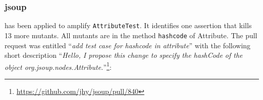 % 


\subsubsection{jsoup}

\dspot has been applied to amplify \texttt{AttributeTest}. 
It identifies one assertion that kills 13 more mutants.
All mutants are in the method \texttt{hashcode} of Attribute. 
The pull request was entitled ``\emph{add test case for hashcode in attribute}'' with the following short description ``\emph{Hello, I propose this change to specify the hashCode of the object org.jsoup.nodes.Attribute.}''\footnote{\url{https://github.com/jhy/jsoup/pull/840}}:
\begin{figure}[H]
	\centering{}
\end{figure}

